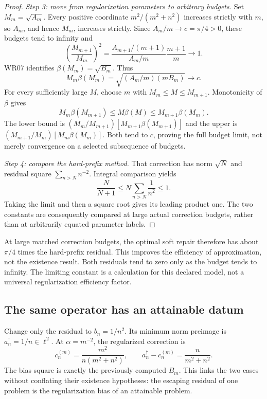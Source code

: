 \begin{proof}
\emph{Step 3: move from regularization parameters to arbitrary budgets.} Set $M_m=\sqrt{A_m}$. Every positive coordinate $m^2/(m^2+n^2)$ increases strictly with $m$, so $A_m$, and hence $M_m$, increases strictly. Since $A_m/m\to c=\pi/4>0$, these budgets tend to infinity and
\[
 \left(\frac{M_{m+1}}{M_m}\right)^2
 =\frac{A_{m+1}/(m+1)}{A_m/m}\frac{m+1}{m}\longrightarrow1.
\]
WR07 identifies $\beta(M_m)=\sqrt{B_m}$. Thus
\[
 M_m\beta(M_m)=\sqrt{(A_m/m)(mB_m)}\longrightarrow c.
\]
For every sufficiently large $M$, choose $m$ with $M_m\le M\le M_{m+1}$. Monotonicity of $\beta$ gives
\[
 M_m\beta(M_{m+1})\le M\beta(M)\le M_{m+1}\beta(M_m).
\]
The lower bound is $(M_m/M_{m+1})[M_{m+1}\beta(M_{m+1})]$ and the upper is $(M_{m+1}/M_m)[M_m\beta(M_m)]$. Both tend to $c$, proving the full budget limit, not merely convergence on a selected subsequence of budgets.

\emph{Step 4: compare the hard-prefix method.} That correction has norm $\sqrt N$ and residual square $\sum_{n>N}n^{-2}$. Integral comparison yields
\[
 \frac{N}{N+1}\le N\sum_{n>N}\frac1{n^2}\le1.
\]
Taking the limit and then a square root gives its leading product one. The two constants are consequently compared at large actual correction budgets, rather than at arbitrarily equated parameter labels.
\end{proof}

At large matched correction budgets, the optimal soft repair therefore has about $\pi/4$ times the hard-prefix residual. This improves the efficiency of approximation, not the existence result. Both residuals tend to zero only as the budget tends to infinity. The limiting constant is a calculation for this declared model, not a universal regularization efficiency factor.


\subsection{The same operator has an attainable datum}
Change only the residual to $b_n=1/n^2$. Its minimum norm preimage is $a^\dagger_n=1/n\in\ell^2$. At $\alpha=m^{-2}$, the regularized correction is
\[
 c^{(m)}_n=\frac{m^2}{n(m^2+n^2)},\qquad
 a^\dagger_n-c^{(m)}_n=\frac{n}{m^2+n^2}.
\]
The bias square is exactly the previously computed $B_m$. This links the two cases without conflating their existence hypotheses: the escaping residual of one problem is the regularization bias of an attainable problem.

